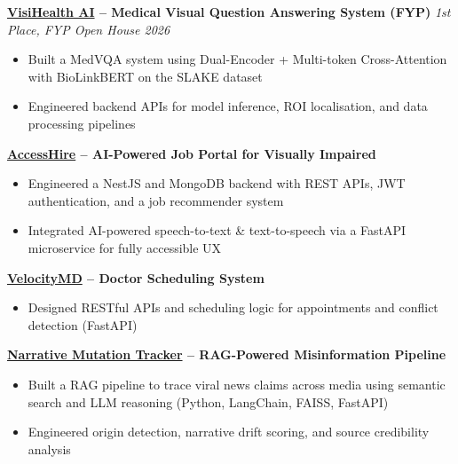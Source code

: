 \documentclass[11pt,a4paper]{article}
\begin{document}
\textbf{\href{https://github.com/hammadcys/VisiHealth-FYP}{VisiHealth AI} -- Medical Visual Question Answering System (FYP)} \hfill \textit{\small 1st Place, FYP Open House 2026}
\vspace{-0.15cm}
\begin{itemize}[leftmargin=1.5em,itemsep=0pt,topsep=1pt]
\item Built a MedVQA system using Dual-Encoder + Multi-token Cross-Attention with BioLinkBERT on the SLAKE dataset
\item Engineered backend APIs for model inference, ROI localisation, and data processing pipelines
\end{itemize}

\textbf{\href{https://hammadcys.github.io/\#proj-accesshire}{AccessHire} -- AI-Powered Job Portal for Visually Impaired}
\vspace{-0.15cm}
\begin{itemize}[leftmargin=1.5em,itemsep=0pt,topsep=1pt]
\item Engineered a NestJS and MongoDB backend with REST APIs, JWT authentication, and a job recommender system
\item Integrated AI-powered speech-to-text \& text-to-speech via a FastAPI microservice for fully accessible UX
\end{itemize}

\textbf{\href{https://hammadcys.github.io/\#proj-velocitymd}{VelocityMD} -- Doctor Scheduling System}
\vspace{-0.15cm}
\begin{itemize}[leftmargin=1.5em,itemsep=0pt,topsep=1pt]
\item Designed RESTful APIs and scheduling logic for appointments and conflict detection (FastAPI)
\end{itemize}


\textbf{\href{https://github.com/hammadcys/narrative-mutation-tracker}{Narrative Mutation Tracker} -- RAG-Powered Misinformation Pipeline}
\vspace{-0.15cm}
\begin{itemize}[leftmargin=1.5em,itemsep=0pt,topsep=1pt]
\item Built a RAG pipeline to trace viral news claims across media using semantic search and LLM reasoning (Python, LangChain, FAISS, FastAPI)
\item Engineered origin detection, narrative drift scoring, and source credibility analysis
\end{itemize}

\end{document}

